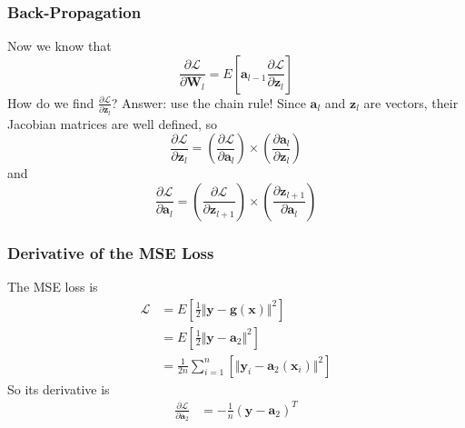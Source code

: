 \documentclass{beamer}
\begin{document}
\begin{frame}
  \frametitle{Back-Propagation}

  Now we know that
  \begin{displaymath}
    \frac{\partial\mathcal{L}}{\partial\mathbf{W}_{l}}=
    E\left[\mathbf{a}_{l-1}\frac{\partial\mathcal{L}}{\partial\mathbf{z}_l}\right]
  \end{displaymath}
  How do we find $\frac{\partial\mathcal{L}}{\partial\mathbf{z}_l}$?
  Answer: use the chain rule!  Since $\mathbf{a}_l$ and $\mathbf{z}_l$
  are vectors, their Jacobian matrices are well defined, so
  \begin{displaymath}
    \frac{\partial\mathcal{L}}{\partial\mathbf{z}_l}
    =
    \left(\frac{\partial\mathcal{L}}{\partial\mathbf{a}_l}\right)\times
    \left(\frac{\partial\mathbf{a}_l}{\partial\mathbf{z}_l}\right)
  \end{displaymath}
  and
  \begin{displaymath}
    \frac{\partial\mathcal{L}}{\partial\mathbf{a}_l}
    =
    \left(\frac{\partial\mathcal{L}}{\partial\mathbf{z}_{l+1}}\right)\times
    \left(\frac{\partial\mathbf{z}_{l+1}}{\partial\mathbf{a}_l}\right)
  \end{displaymath}
\end{frame}


\begin{frame}
  \frametitle{Derivative of the MSE Loss}

  The MSE loss is
  \begin{align*}
    \mathcal{L}
    &=E\left[\frac{1}{2}\Vert\mathbf{y}-\mathbf{g}(\mathbf{x})\Vert^2\right]\\
    &=E\left[\frac{1}{2}\Vert\mathbf{y}-\mathbf{a}_2\Vert^2\right]\\
    &=\frac{1}{2n}\sum_{i=1}^n\left[\Vert\mathbf{y}_i-\mathbf{a}_2(\mathbf{x}_i)\Vert^2\right]
  \end{align*}
  So its derivative is
  \begin{align*}
    \frac{\partial\mathcal{L}}{\partial\mathbf{a}_2}
    &= -\frac{1}{n}\left(\mathbf{y}-\mathbf{a}_2\right)^T
  \end{align*}
\end{frame}
  
\end{document}
